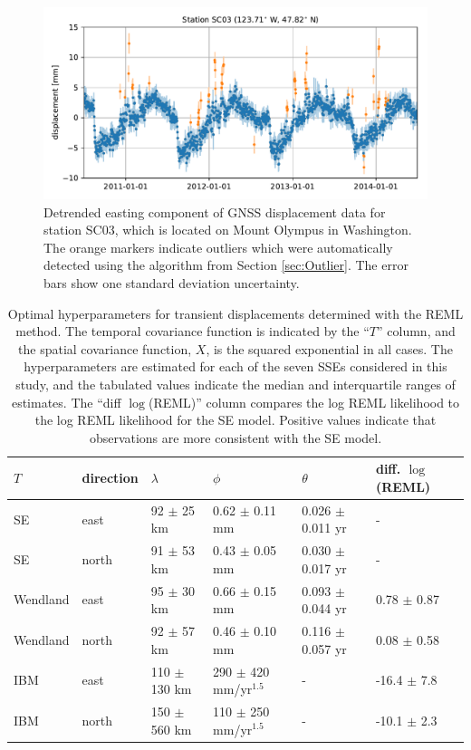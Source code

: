 \documentclass[10pt,letter]{article}
\begin{document}
\begin{figure}
\includegraphics{figures/outliers/outliers.pdf}
\caption{Detrended easting component of GNSS displacement data for station SC03, which is located on Mount Olympus in Washington.  The orange markers indicate outliers which were automatically detected using the algorithm from Section \ref{sec:Outlier}. The error bars show one standard deviation uncertainty.}   
\label{fig:Outliers}
\end{figure}

\begin{table}\label{tab:Parameters}
\begin{tabular} {l l l l l l}
$T$ & direction & $\lambda$  & $\phi$   & $\theta$  & diff. $\log$(REML) \\ \hline
SE & east   & 92 $\pm$ 25 km  & 0.62 $\pm$ 0.11 mm  & 0.026 $\pm$ 0.011 yr  &  - \\
SE & north  & 91 $\pm$ 53 km  & 0.43 $\pm$ 0.05 mm  & 0.030 $\pm$ 0.017 yr  &  - \\
Wendland & east   & 95 $\pm$ 30 km  & 0.66 $\pm$ 0.15 mm  & 0.093 $\pm$ 0.044 yr &  0.78 $\pm$ 0.87 \\
Wendland & north  & 92 $\pm$ 57 km  & 0.46 $\pm$ 0.10 mm  & 0.116 $\pm$ 0.057 yr &  0.08 $\pm$ 0.58 \\
IBM & east   & 110 $\pm$ 130 km & 290 $\pm$ 420 mm/yr$^{1.5}$  & -          & -16.4 $\pm$ 7.8 \\
IBM & north  & 150 $\pm$ 560 km & 110 $\pm$ 250 mm/yr$^{1.5}$ & -           & -10.1 $\pm$ 2.3 \\
\end{tabular}
\caption{Optimal hyperparameters for transient displacements determined with the REML method.  The temporal covariance function is indicated by the ``$T$'' column, and the spatial covariance function, $X$, is the squared exponential in all cases. The hyperparameters are estimated for each of the seven SSEs considered in this study, and the tabulated values indicate the median and interquartile ranges of estimates. The ``diff $\log$(REML)'' column compares the log REML likelihood to the log REML likelihood for the SE model. Positive values indicate that observations are more consistent with the SE model.} 
\end{table}
\end{document}
